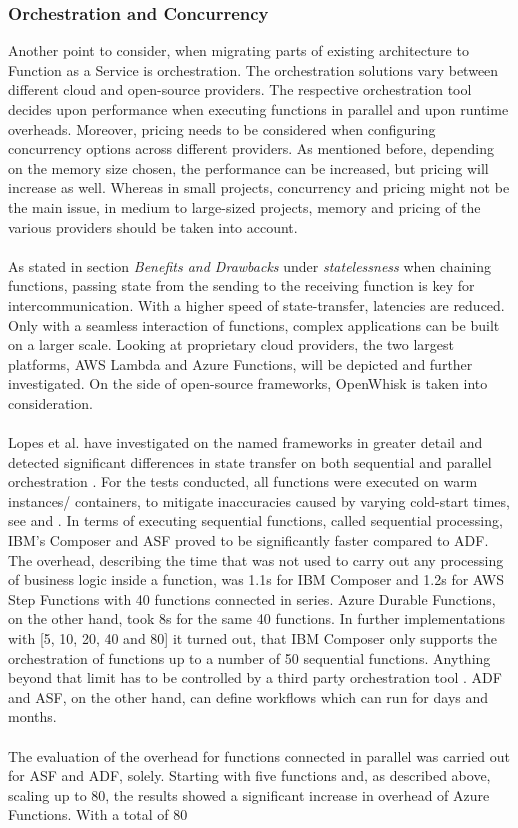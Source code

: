 \documentclass[a4paper,twoside,11pt, pagesize]{scrartcl}
\begin{document}
\subsubsection{Orchestration and Concurrency}
 Another point to consider, when migrating parts of existing architecture to Function as a Service is orchestration. The orchestration solutions vary between different cloud and open-source providers. The respective orchestration tool decides upon performance when executing functions in parallel and upon runtime overheads. Moreover, pricing needs to be considered when configuring concurrency options across different providers. As mentioned before, depending on the memory size chosen, the performance can be increased, but pricing will increase as well. Whereas in small projects, concurrency and pricing might not be the main issue, in medium to large-sized projects, memory and pricing of the various providers should be taken into account.\\\\ As stated in section \textit{Benefits and Drawbacks} under \textit{statelessness} when chaining functions, passing state from the sending to the receiving function is key for intercommunication. With a higher speed of state-transfer, latencies are reduced. Only with a seamless interaction of functions, complex applications can be built on a larger scale. Looking at proprietary cloud providers, the two largest platforms, AWS Lambda and Azure Functions,  will be depicted and further investigated. On the side of open-source frameworks, OpenWhisk is taken into consideration.\\\\ Lopes et al. have investigated on the named frameworks in greater detail and detected significant differences in state transfer on both sequential and parallel orchestration \cite{lopez2018comparison}. For the tests conducted, all functions were executed on warm instances/ containers, to mitigate inaccuracies caused by varying cold-start times, see \cite{manner2018cold} and \cite{jackson2018investigation}. In terms of executing sequential functions, called sequential processing, IBM's Composer and ASF proved to be significantly faster compared to ADF. The overhead, describing the time that was not used to carry out any processing of business logic inside a function, was 1.1s for IBM Composer and 1.2s for AWS Step Functions with 40 functions connected in series. Azure Durable Functions, on the other hand, took 8s for the same 40 functions. In further implementations with [5, 10, 20, 40 and 80] it turned out, that IBM Composer only supports the orchestration of functions up to a number of 50 sequential functions. Anything beyond that limit has to be controlled by a third party orchestration tool \cite{lopez2018comparison}. ADF and ASF, on the other hand, can define workflows which can run for days and months.\\\\ The evaluation of the overhead for functions connected in parallel was carried out for ASF and ADF, solely. Starting with five functions and, as described above, scaling up to 80, the results showed a significant increase in overhead of Azure Functions. With a total of 80 
\end{document}
